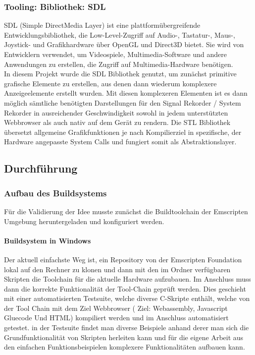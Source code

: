 \subsubsection{Tooling: Bibliothek: SDL}
SDL (Simple DirectMedia Layer) ist eine plattformübergreifende Entwicklungsbibliothek, die Low-Level-Zugriff auf Audio-, Tastatur-, Maus-, Joystick- und Grafikhardware über OpenGL und Direct3D bietet. Sie wird von Entwicklern verwendet, um Videospiele, Multimedia-Software und andere Anwendungen zu erstellen, die Zugriff auf Multimedia-Hardware benötigen. \\
In diesem Projekt wurde die SDL Bibliothek genutzt, um zunächst primitive grafische Elemente zu erstellen, aus denen dann wiederum komplexere Anzeigeelemente erstellt wurden. Mit diesen komplexeren Elementen  ist es dann möglich sämtliche benötigten Darstellungen für den Signal Rekorder / System Rekorder in ausreichender Geschwindigkeit sowohl in jedem  unterstützten Webbrowser als auch nativ auf dem Gerät zu rendern. Die STL Bibliothek übersetzt allgemeine Grafikfunktionen je nach Kompilierziel in spezifische, der Hardware angepasste System Calls und fungiert somit als Abstraktionslayer. 
\cite*{sdlwebsite} \\
\subsection{Durchführung}
\subsubsection{Aufbau des Buildsystems}
Für die Validierung der Idee musste zunächst die Buildtoolchain der Emscripten Umgebung heruntergeladen und konfiguriert werden. 


\paragraph*{Buildsystem in Windows}
Der aktuell einfachste Weg ist, ein Repository von der Emscripten Foundation lokal auf den Rechner zu klonen und dann mit den im Ordner verfügbaren Skripten die Toolchain für die aktuelle Hardware aufzubauen. 
Im Anschluss muss dann die korrekte Funktionalität der Tool-Chain geprüft werden. Dies geschieht mit einer automatisierten Testsuite, welche diverse C-Skripte enthält, welche von der Tool Chain mit dem Ziel Webbrowser ( Ziel: Webassembly, Javascript Gluecode Und HTML) kompiliert werden und im Anschluss automatisiert getestet.
in der Testsuite findet man diverse Beispiele anhand derer man sich die Grundfunktionalität von Skripten herleiten kann und für die eigene Arbeit aus den einfachen Funktionsbeispielen komplexere Funktionalitäten aufbauen kann. \cite*{emscriptendownload}\\

